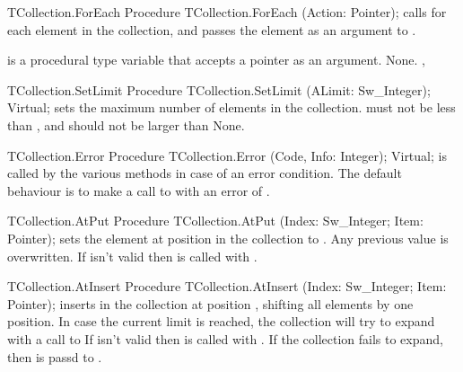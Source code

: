 \begin{procedure}{TCollection.ForEach}
\Declaration
Procedure TCollection.ForEach (Action: Pointer);
\Description
{} calls  for each element in the collection,
and passes the element as an argument to .

 is a procedural type variable that accepts a pointer as an 
argument.
\Errors
None.
\SeeAlso
{}, 
\end{procedure}


\begin{procedure}{TCollection.SetLimit}
\Declaration
Procedure TCollection.SetLimit (ALimit: Sw\_Integer); Virtual;
\Description
{} sets the maximum number of elements in the collection.
 must not be less than , and should not be larger
than 
\Errors
None.
\SeeAlso
{}
\end{procedure}


\begin{procedure}{TCollection.Error}
\Declaration
Procedure TCollection.Error (Code, Info: Integer); Virtual;
\Description
{} is called by the various  methods
in case of an error condition. The default behaviour is to make
a call to  with an error of .
\Errors
\SeeAlso
\end{procedure}


\begin{procedure}{TCollection.AtPut}
\Declaration
Procedure TCollection.AtPut (Index: Sw\_Integer; Item: Pointer);
\Description
{} sets the element at position  in the collection
to . Any previous value is overwritten.
\Errors
If  isn't valid then  is called
with .
\SeeAlso
\end{procedure}


\begin{procedure}{TCollection.AtInsert}
\Declaration
Procedure TCollection.AtInsert (Index: Sw\_Integer; Item: Pointer);
\Description
{} inserts  in the collection at position ,
shifting all elements by one position. In case the current limit is reached,
the collection will try to expand with a call to 
\Errors
If  isn't valid then  is called
with . If the collection fails to expand, then
 is passd to .
\SeeAlso
{}
\end{procedure}


